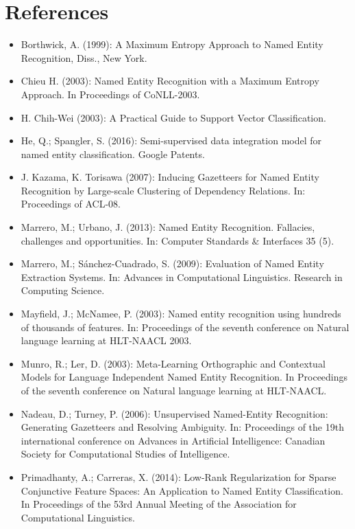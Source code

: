 \documentclass[a4paper, 11pt]{article}
\begin{document}
\section{References}
\begin{itemize}
\item Borthwick, A. (1999): A
				Maximum Entropy Approach to Named Entity Recognition, Diss., New York.\\
			\item Chieu H. (2003): Named Entity Recognition with a Maximum Entropy Approach. In Proceedings of CoNLL-2003.
			\item H. Chih-Wei (2003): A Practical Guide to Support Vector Classification.
			\item He, Q.; Spangler, S. (2016): Semi-supervised data integration model for named entity classification. Google Patents.
			\item J. Kazama, K. Torisawa (2007): Inducing Gazetteers for Named Entity Recognition
			by Large-scale Clustering of Dependency Relations. In: Proceedings of ACL-08.\\
			\item Marrero, M.; Urbano, J. (2013): Named Entity Recognition. Fallacies, challenges and opportunities. In: Computer Standards \& Interfaces 35 (5).\\
			\item Marrero, M.; Sánchez-Cuadrado, S. (2009): Evaluation of Named Entity Extraction Systems. In: Advances in Computational Linguistics. Research in Computing Science.\\
						\item Mayfield, J.; McNamee, P. (2003): Named entity recognition using hundreds of thousands of features. In: Proceedings of the seventh conference on Natural language learning at HLT-NAACL 2003.\\
						\item Munro, R.; Ler, D. (2003): Meta-Learning Orthographic and Contextual Models for Language Independent Named Entity Recognition. In Proceedings of the seventh conference on Natural language learning at HLT-NAACL.\\
						\item Nadeau, D.; Turney, P. (2006): Unsupervised Named-Entity Recognition: Generating Gazetteers and Resolving Ambiguity. In: Proceedings of the 19th international conference on Advances in Artificial Intelligence: Canadian Society for Computational Studies of Intelligence.
						\item Primadhanty, A.; Carreras, X. (2014): Low-Rank Regularization for Sparse Conjunctive Feature Spaces:
						An Application to Named Entity Classification. In Proceedings of the 53rd Annual Meeting of the Association for Computational Linguistics.


\end{itemize}
\end{document}
